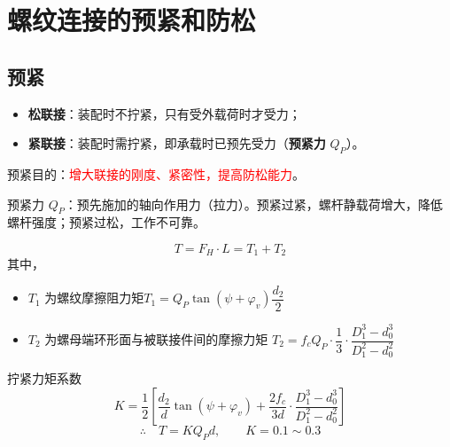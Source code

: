\section{螺纹连接的预紧和防松}
\label{sec:预紧和防松}

\subsection{预紧}

\begin{definition}[松联接与紧联接]
\label{def:松紧联接}
\begin{itemize}
	\item \textbf{松联接}：装配时不拧紧，只有受外载荷时才受力；
	\item \textbf{紧联接}：装配时需拧紧，即承载时已预先受力（\textbf{预紧力} $Q_P$）。
\end{itemize}
\end{definition}

\begin{definition}[预紧的目的]
\label{def:预紧目的}
预紧目的：\textcolor{red}{增大联接的刚度、紧密性，提高防松能力}。

预紧力 $Q_P$：预先施加的轴向作用力（拉力）。预紧过紧，螺杆静载荷增大，降低螺杆强度；预紧过松，工作不可靠。
\end{definition}

\begin{theorem}[扳手拧紧力矩]
\label{thm:拧紧力矩}
\begin{equation}
	T=F_H\cdot L=T_1+T_2
	\label{eq:预紧:拧紧力矩}
\end{equation}
其中，
\begin{itemize}
    \item $T_1$ 为螺纹摩擦阻力矩$T_1=Q_P\tan(\psi+\varphi_v)\dfrac{d_2}{2}$
    \item $T_2$ 为螺母端环形面与被联接件间的摩擦力矩 $T_2=f_cQ_P\cdot\dfrac{1}{3}\cdot\dfrac{D_1^3-d_0^3}{D_1^2-d_0^2}$
\end{itemize}


拧紧力矩系数
\begin{equation}
	K=\frac{1}{2}\left[\frac{d_2}{d}\tan(\psi+\varphi_v)+\frac{2f_c}{3d}\cdot\frac{D_1^3-d_0^3}{D_1^2-d_0^2}\right]
	\label{eq:预紧:力矩系数}
\end{equation}
\begin{equation}
	\therefore\quad T=KQ_P d,\qquad K=0.1\sim0.3
	\label{eq:预紧:拧紧力矩简化}
\end{equation}
\end{theorem}


